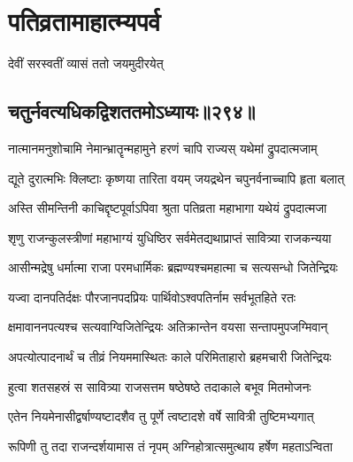 \part{पतिव्रतामाहात्म्यपर्व}
\newcommand{\onelineindentedshloka}[2]{
    {#1\hspace{\shlokaspaceskip}}\\
\onelineshloka{\hspace{\shlokaspaceskip}#2}}


{देवीं सरस्वतीं व्यासं ततो जयमुदीरयेत्}

\chapter{चतुर्नवत्यधिकद्विशततमोऽध्यायः॥२९४॥}


\twolineshloka
{नात्मानमनुशोचामि नेमान्भ्रातॄन्महामुने}
{हरणं चापि राज्यस् यथेमां द्रुपदात्मजाम्}


\twolineshloka
{द्यूते दुरात्मभिः क्लिष्टाः कृष्णया तारिता वयम्}
{जयद्रथेन चपुनर्वनाच्चापि हृता बलात्}


\twolineshloka
{अस्ति सीमन्तिनी काचिद्दृष्टपूर्वाऽपिवा श्रुता}
{पतिव्रता महाभागा यथेयं द्रुपदात्मजा}




\twolineshloka
{शृणु राजन्कुलस्त्रीणां महाभाग्यं युधिष्ठिर}
{सर्वमेतद्यथाप्राप्तं सावित्र्या राजकन्यया}


\twolineshloka
{आसीन्मद्रेषु धर्मात्मा राजा परमधार्मिकः}
{ब्रह्मण्यश्चमहात्मा च सत्यसन्धो जितेन्द्रियः}


\twolineshloka
{यज्वा दानपतिर्दक्षः पौरजानपदप्रियः}
{पार्थिवोऽश्वपतिर्नाम सर्वभूतहिते रतः}


\twolineshloka
{क्षमावाननपत्यश्च सत्यवाग्विजितेन्द्रियः}
{अतिक्रान्तेन वयसा सन्तापमुपजग्मिवान्}


\twolineshloka
{अपत्योत्पादनार्थं च तीव्रं नियममास्थितः}
{काले परिमिताहारो ब्रहमचारी जितेन्द्रियः}


\twolineshloka
{हुत्वा शतसहस्रं स सावित्र्या राजसत्तम}
{षष्ठेषष्ठे तदाकाले बभूव मितमोजनः}


\twolineshloka
{एतेन नियमेनासीद्वर्षाण्यष्टादशैव तु}
{पूर्णे त्वष्टादशे वर्षे सावित्री तुष्टिमभ्यगात्}


\twolineshloka
{रूपिणी तु तदा राजन्दर्शयामास तं नृपम्}
{अग्निहोत्रात्समुत्थाय हर्षेण महताऽन्विता}


